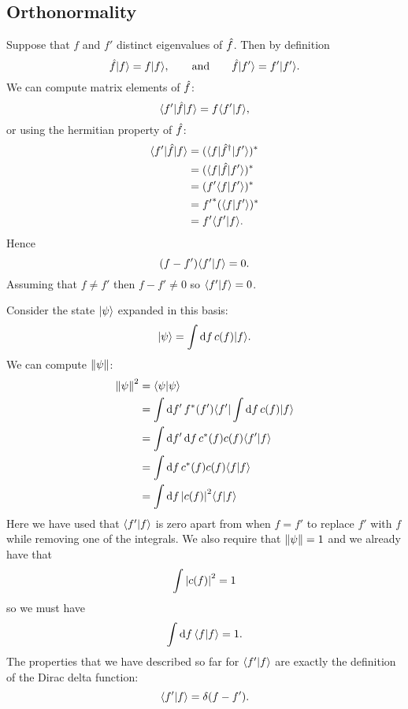     \subsection{Orthonormality}
    Suppose that \(f\) and \(f'\) distinct eigenvalues of \(\hat{f}\).
    Then by definition
    \[\hat{f}\vert {f} \rangle = f\vert {f} \rangle,\qquad\text{and}\qquad \hat{f}\vert {f'} \rangle = f'\vert {f'} \rangle.\]
    We can compute matrix elements of \(\hat{f}\):
    \[\langle {f'} \vert\hat{f}\vert {f} \rangle = f\langle {f'} \vert {f} \rangle,\]
    or using the hermitian property of \(\hat{f}\):
    \begin{align*}
        \langle {f'} \vert\hat{f}\vert {f} \rangle &= (\langle {f} \vert\hat{f}^\dagger\vert {f'} \rangle)^*\\
        &= (\langle {f} \vert\hat{f}\vert {f'} \rangle)^*\\
        &= (f'\langle {f} \vert {f'} \rangle)^*\\
        &= {f'}^*(\langle {f} \vert {f'} \rangle)^*\\
        &= f'\langle {f'} \vert {f} \rangle.
    \end{align*}
    Hence
    \[(f - f')\langle {f'} \vert {f} \rangle = 0.\]
    Assuming that \(f \ne f'\) then \(f - f' \ne 0\) so \(\langle {f'} \vert {f} \rangle = 0\).
    
    Consider the state \(\vert {\psi} \rangle\) expanded in this basis:
    \[\vert {\psi} \rangle = \int\dd{f} c(f)\vert {f} \rangle.\]
    We can compute \(\norm{\psi}\):
    \begin{align*}
        \norm{\psi}^2 &= \langle {\psi} \vert {\psi} \rangle\\
        &= \int\dd{f'}f^*(f')\langle {f'} \vert\int\dd{f}c(f)\vert {f} \rangle\\
        &= \int\dd{f'}\dd{f}c^*(f)c(f)\langle {f'} \vert {f} \rangle\\
        &= \int\dd{f}c^*(f)c(f)\langle {f} \vert {f} \rangle\\
        &= \int\dd{f}\abs{c(f)}^2\langle {f} \vert {f} \rangle
    \end{align*}
    Here we have used that \(\langle {f'} \vert {f} \rangle\) is zero apart from when \(f = f'\) to replace \(f'\) with \(f\) while removing one of the integrals.
    We also require that \(\norm{\psi} = 1\) and we already have that
    \[\int\abs{c(f)}^2 = 1\]
    so we must have
    \[\int\dd{f}\langle {f} \vert {f} \rangle = 1.\]
    The properties that we have described so far for \(\langle {f'} \vert {f} \rangle\) are exactly the definition of the Dirac delta function:
    \[\langle {f'} \vert {f} \rangle = \delta(f - f').\]
    
